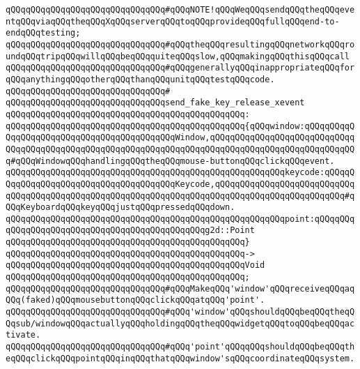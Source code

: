 \verb|qQQqqQQqqQQqqQQqqQQqqQQqqQQqqQQq#qQQqNOTE!qQQqWeqQQqsendqQQqtheqQQqeventqQQqviaqQQqtheqQQqXqQQqserverqQQqtoqQQqprovideqQQqfullqQQqend-to-endqQQqtesting;|\newline
\verb|qQQqqQQqqQQqqQQqqQQqqQQqqQQqqQQq#qQQqtheqQQqresultingqQQqnetworkqQQqroundqQQqtripqQQqwillqQQqbeqQQqquiteqQQqslow,qQQqmakingqQQqthisqQQqcall|\newline
\verb|qQQqqQQqqQQqqQQqqQQqqQQqqQQqqQQq#qQQqgenerallyqQQqinappropriateqQQqforqQQqanythingqQQqotherqQQqthanqQQqunitqQQqtestqQQqcode.|\newline
\verb|qQQqqQQqqQQqqQQqqQQqqQQqqQQqqQQq#|\newline
\verb|qQQqqQQqqQQqqQQqqQQqqQQqqQQqqQQqsend_fake_key_release_xevent|\newline
\verb|qQQqqQQqqQQqqQQqqQQqqQQqqQQqqQQqqQQqqQQqqQQqqQQq:|\newline
\verb|qQQqqQQqqQQqqQQqqQQqqQQqqQQqqQQqqQQqqQQqqQQqqQQq{qQQqwindow:qQQqqQQqqQQqqQQqqQQqqQQqqQQqqQQqqQQqqQQqqQQqWindow,qQQqqQQqqQQqqQQqqQQqqQQqqQQqqQQqqQQqqQQqqQQqqQQqqQQqqQQqqQQqqQQqqQQqqQQqqQQqqQQqqQQqqQQqqQQqqQQqqQQq#qQQqWindowqQQqhandlingqQQqtheqQQqmouse-buttonqQQqclickqQQqevent.|\newline
\verb|qQQqqQQqqQQqqQQqqQQqqQQqqQQqqQQqqQQqqQQqqQQqqQQqqQQqqQQqkeycode:qQQqqQQqqQQqqQQqqQQqqQQqqQQqqQQqqQQqqQQqKeycode,qQQqqQQqqQQqqQQqqQQqqQQqqQQqqQQqqQQqqQQqqQQqqQQqqQQqqQQqqQQqqQQqqQQqqQQqqQQqqQQqqQQqqQQqqQQqqQQq#qQQqKeyboardqQQqkeyqQQqjustqQQqpressedqQQqdown.|\newline
\verb|qQQqqQQqqQQqqQQqqQQqqQQqqQQqqQQqqQQqqQQqqQQqqQQqqQQqqQQqpoint:qQQqqQQqqQQqqQQqqQQqqQQqqQQqqQQqqQQqqQQqqQQqqQQqg2d::Point|\newline
\verb|qQQqqQQqqQQqqQQqqQQqqQQqqQQqqQQqqQQqqQQqqQQqqQQq}|\newline
\verb|qQQqqQQqqQQqqQQqqQQqqQQqqQQqqQQqqQQqqQQqqQQqqQQq->|\newline
\verb|qQQqqQQqqQQqqQQqqQQqqQQqqQQqqQQqqQQqqQQqqQQqqQQqVoid|\newline
\verb|qQQqqQQqqQQqqQQqqQQqqQQqqQQqqQQqqQQqqQQqqQQqqQQq;|\newline
\newline
\verb|qQQqqQQqqQQqqQQqqQQqqQQqqQQqqQQq#qQQqMakeqQQq'window'qQQqreceiveqQQqaqQQq(faked)qQQqmousebuttonqQQqclickqQQqatqQQq'point'.|\newline
\verb|qQQqqQQqqQQqqQQqqQQqqQQqqQQqqQQq#qQQq'window'qQQqshouldqQQqbeqQQqtheqQQqsub/windowqQQqactuallyqQQqholdingqQQqtheqQQqwidgetqQQqtoqQQqbeqQQqactivate.|\newline
\verb|qQQqqQQqqQQqqQQqqQQqqQQqqQQqqQQq#qQQq'point'qQQqqQQqshouldqQQqbeqQQqtheqQQqclickqQQqpointqQQqinqQQqthatqQQqwindow'sqQQqcoordinateqQQqsystem.|\newline
